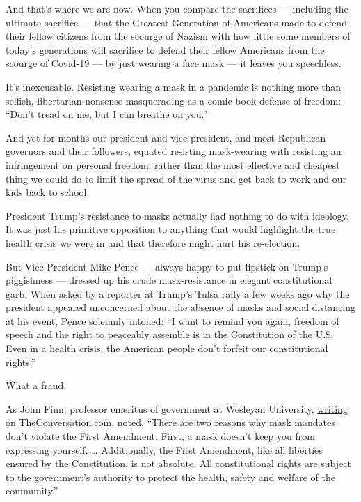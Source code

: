 And that's where we are now. When you compare the sacrifices ---
including the ultimate sacrifice --- that the Greatest Generation of
Americans made to defend their fellow citizens from the scourge of
Nazism with how little some members of today's generations will
sacrifice to defend their fellow Americans from the scourge of Covid-19
--- by just wearing a face mask --- it leaves you speechless.

It's inexcusable. Resisting wearing a mask in a pandemic is nothing more
than selfish, libertarian nonsense masquerading as a comic-book defense
of freedom: ``Don't tread on me, but I can breathe on you.''

And yet for months our president and vice president, and most Republican
governors and their followers, equated resisting mask-wearing with
resisting an infringement on personal freedom, rather than the most
effective and cheapest thing we could do to limit the spread of the
virus and get back to work and our kids back to school.

President Trump's resistance to masks actually had nothing to do with
ideology. It was just his primitive opposition to anything that would
highlight the true health crisis we were in and that therefore might
hurt his re-election.

But Vice President Mike Pence --- always happy to put lipstick on
Trump's piggishness --- dressed up his crude mask-resistance in elegant
constitutional garb. When asked by a reporter at Trump's Tulsa rally a
few weeks ago why the president appeared unconcerned about the absence
of masks and social distancing at his event, Pence solemnly intoned: ``I
want to remind you again, freedom of speech and the right to peaceably
assemble is in the Constitution of the U.S. Even in a health crisis, the
American people don't forfeit our
\href{https://www.esquire.com/news-politics/politics/a32984272/mike-pence-masks-social-distancing-trump-rallies/}{constitutional
rights}.''

What a fraud.

As John Finn, professor emeritus of government at Wesleyan University,
\href{https://theconversation.com/the-constitution-doesnt-have-a-problem-with-mask-mandates-142335}{writing
on TheConversation.com}, noted, ``There are two reasons why mask
mandates don't violate the First Amendment. First, a mask doesn't keep
you from expressing yourself. \ldots{} Additionally, the First
Amendment, like all liberties ensured by the Constitution, is not
absolute. All constitutional rights are subject to the government's
authority to protect the health, safety and welfare of the community.''

